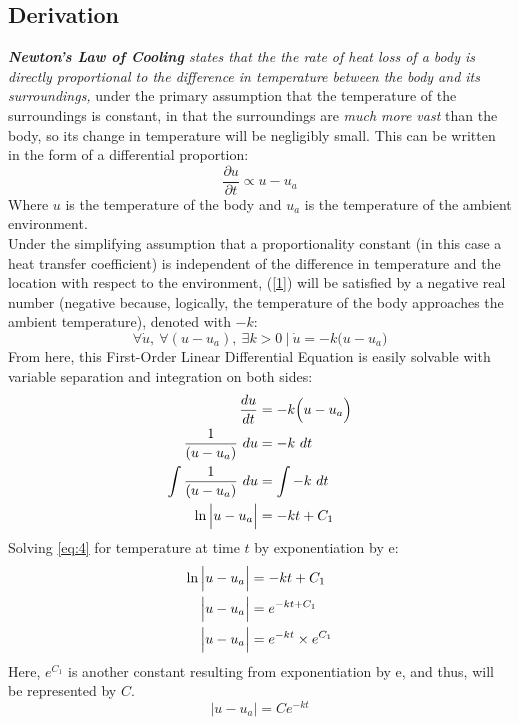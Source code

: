 \documentclass[10pt]{article}
\begin{document}
\subsection{Derivation}
\textit{\textbf{Newton's Law of Cooling} states that the the rate of heat loss of a body is directly proportional to the difference in temperature between the body and its surroundings,} under the primary assumption that the temperature of the surroundings is constant, in that the surroundings are \textit{much more vast} than the body,  so its change in temperature will be negligibly small. This can be written in the form of a differential proportion:
	\begin{equation} \label{1}
	\frac{\partial{u}}{\partial{t}} \propto u-u_{a}
	\end{equation}
Where $u$ is the temperature of the body and $u_{a}$ is the temperature of the ambient environment. \\
Under the simplifying assumption that a proportionality constant (in this case a heat transfer coefficient) is independent of the difference in temperature and the location with respect to the environment,
(\ref{1}) will be satisfied by a negative real number (negative because, logically, the temperature of the body approaches the ambient temperature), denoted with $-k$:
	\begin{equation}
	\forall \dot{u},\ \forall (u-u_a),\ \exists k>0\ |\ \dot{u} = -k \Big( u-u_{a} \Big)
	\end{equation}
From here, this First-Order Linear Differential Equation is easily solvable with variable separation and integration on both sides:
	\begin{align}
	\frac{du}{dt} &= -k \Big( u-u_{a} \Big) \notag \\
	\frac{1}{( u-u_{a} )}\ du &= -k \ dt \notag \\ 
	\int \frac{1}{( u-u_{a} )}\ du &= \int -k\ dt \label{eq:3} \\
	\ln \Big| u-u_{a} \Big| &= -kt + C_1 \label{eq:4}
	\end{align}
Solving \eqref{eq:4} for temperature at time $t$ by exponentiation by e:
	\begin{align*}
	\ln \Big| u-u_{a} \Big| &= -kt + C_1 \notag \\
	\Big| u-u_{a} \Big| &= e^{-kt + C_1} \notag \\
	\Big| u-u_{a} \Big| &= e^{-kt} \times e^{C_1}
	\end{align*}
Here, $e^{C_1}$ is another constant resulting from exponentiation by e, and thus, will be represented by $C$. 
	\begin{equation}
	\Big| u-u_{a} \Big| = Ce^{-kt}  \label{eq:5}
	\end{equation}
	
\end{document}
